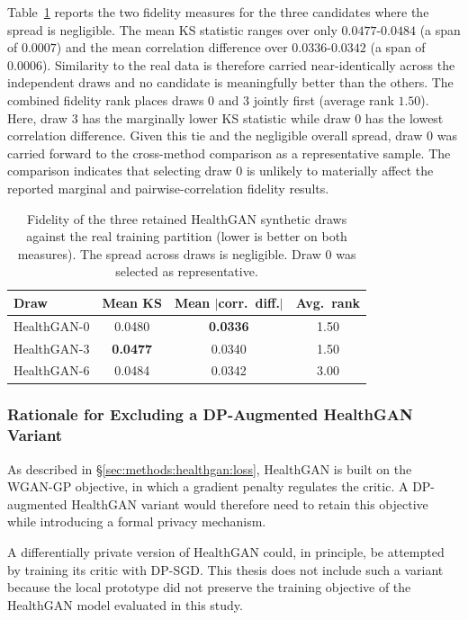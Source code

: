 Table~\ref{tab:hg-variants} reports the two fidelity measures for the three
candidates where the spread is negligible. The mean KS statistic ranges over only
$0.0477$-$0.0484$ (a span of $0.0007$) and the mean correlation difference
over $0.0336$-$0.0342$ (a span of $0.0006$). Similarity to the real data is
therefore carried near-identically across the independent draws and no
candidate is meaningfully better than the others. The combined fidelity rank
places draws $0$ and $3$ jointly first (average rank $1.50$). Here, draw $3$ has
the marginally lower KS statistic while draw $0$ has the lowest correlation
difference. Given this tie and the negligible overall spread, draw $0$ was
carried forward to the cross-method comparison as a representative sample.
The comparison indicates that selecting draw $0$ is unlikely to materially
affect the reported marginal and pairwise-correlation fidelity results.

\begin{table}[H]
\centering
\small
\caption{Fidelity of the three retained HealthGAN synthetic draws against
the real training partition (lower is better on both measures). The spread
across draws is negligible. Draw $0$ was selected as representative.}
\label{tab:hg-variants}
\begin{tabular}{lccc}
\toprule
Draw & Mean KS  & Mean $|$corr.\ diff.$|$ & Avg.\ rank \\
\midrule
HealthGAN-0 & 0.0480 & \textbf{0.0336} & 1.50 \\
HealthGAN-3 & \textbf{0.0477} & 0.0340 & 1.50 \\
HealthGAN-6 & 0.0484 & 0.0342 & 3.00 \\
\bottomrule
\end{tabular}
\end{table}

\subsubsection{Rationale for Excluding a DP-Augmented HealthGAN Variant}
\label{sec:methods:healthgan:nodp}

As described in \S\ref{sec:methods:healthgan:loss}, HealthGAN is built on the
WGAN-GP objective, in which a gradient penalty regulates the critic. 
A DP-augmented HealthGAN variant would
therefore need to retain this objective while introducing a formal privacy
mechanism.

A differentially private version of HealthGAN could, in principle, be attempted
by training its critic with DP-SGD. This thesis does not include such a variant
because the local prototype did not preserve the training objective of the
HealthGAN model evaluated in this study.

